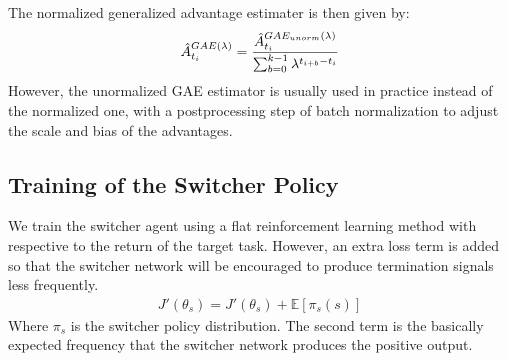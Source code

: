The normalized generalized advantage estimater is then given by:
\begin{align}
\hat{A}_{t_i}^{GAE(\lambda)}
= \frac{\hat{A}_{t_i}^{GAE_{unorm}(\lambda)}}{\sum_{b=0}^{k-1} \lambda^{t_{i+b}-t_i}}
\end{align}
However, the unormalized GAE estimator is usually used in practice instead of the normalized one, with a postprocessing step of batch normalization to adjust the scale and bias of the advantages. 

\subsection{Training of the Switcher Policy}
We train the switcher agent using a flat reinforcement learning method with respective to the return of the target task. However, an extra loss term is added so that the switcher network will be encouraged to produce termination signals less frequently.
\begin{align}
J'(\theta_s) = J'(\theta_s) + \mathbb{E}[\pi_s(s)]
\end{align}
Where $\pi_s$ is the switcher policy distribution. The second term is the basically expected frequency that the switcher network produces the positive output.

